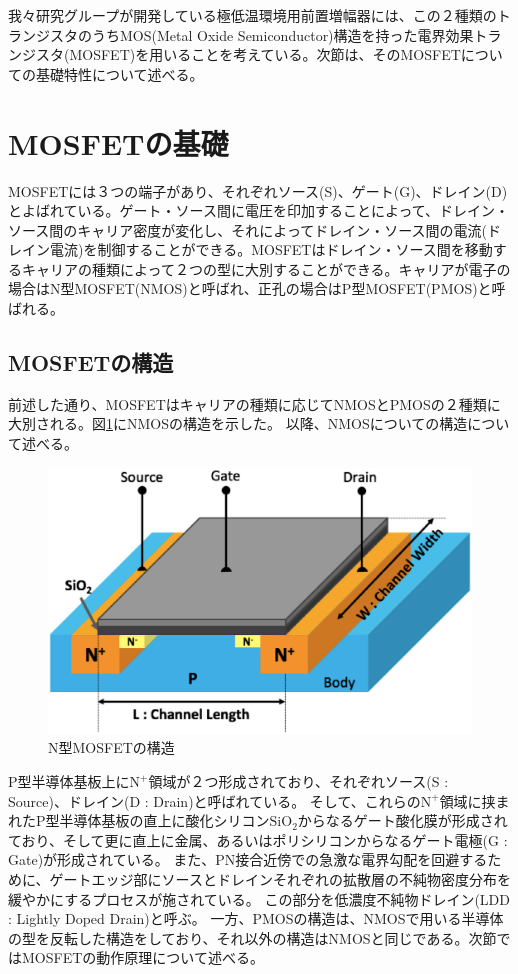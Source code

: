 		我々研究グループが開発している極低温環境用前置増幅器には、この２種類のトランジスタのうちMOS(Metal Oxide Semiconductor)構造を持った電界効果トランジスタ(MOSFET)を用いることを考えている。次節は、そのMOSFETについての基礎特性について述べる。
		
\section{MOSFETの基礎}
	MOSFETには３つの端子があり、それぞれソース(S)、ゲート(G)、ドレイン(D)とよばれている。ゲート・ソース間に電圧を印加することによって、ドレイン・ソース間のキャリア密度が変化し、それによってドレイン・ソース間の電流(ドレイン電流)を制御することができる。MOSFETはドレイン・ソース間を移動するキャリアの種類によって２つの型に大別することができる。キャリアが電子の場合はN型MOSFET(NMOS)と呼ばれ、正孔の場合はP型MOSFET(PMOS)と呼ばれる。
	\subsection{MOSFETの構造}
		前述した通り、MOSFETはキャリアの種類に応じてNMOSとPMOSの２種類に大別される。図\ref{fig:MOSFET_N_structure}にNMOSの構造を示した。
		以降、NMOSについての構造について述べる。
		\begin{figure}[htbp]
			\begin{center}
				\includegraphics[width=12.0cm]{./Chapter/Chapter3/Picture/MOSFET_N_structure.eps}
				\caption{N型MOSFETの構造}
				\label{fig:MOSFET_N_structure}
			\end{center}
		\end{figure}
		P型半導体基板上に$\mathrm{N^+}$領域が２つ形成されており、それぞれソース(S : Source)、ドレイン(D : Drain)と呼ばれている。
		そして、これらの$\mathrm{N^+}$領域に挟まれたP型半導体基板の直上に酸化シリコン$\mathrm{SiO_2}$からなるゲート酸化膜が形成されており、そして更に直上に金属、あるいはポリシリコンからなるゲート電極(G : Gate)が形成されている。
		また、PN接合近傍での急激な電界勾配を回避するために、ゲートエッジ部にソースとドレインそれぞれの拡散層の不純物密度分布を緩やかにするプロセスが施されている。
		この部分を低濃度不純物ドレイン(LDD : Lightly Doped Drain)と呼ぶ。
		一方、PMOSの構造は、NMOSで用いる半導体の型を反転した構造をしており、それ以外の構造はNMOSと同じである。次節ではMOSFETの動作原理について述べる。
